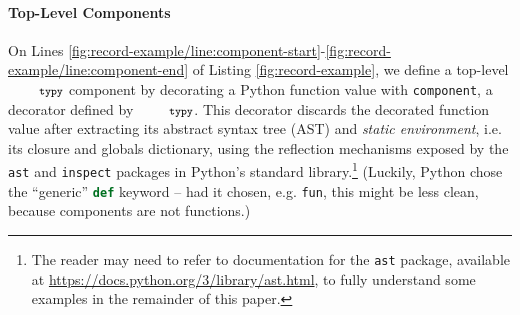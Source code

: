 \documentclass[10pt]{sigplanconf}
\newcommand{\typy}{\texttt{\footnotesize typy}}
\newcommand{\lip}[1]{\lstinline[language=Python,basicstyle=\ttfamily\footnotesize,morekeywords={with},deletendkeywords={tuple,buffer,map}]{#1}}
\newcommand{\li}[1]{\lip{#1}}
\begin{document}



\paragraph{Top-Level Components}
On Lines \ref{fig:record-example/line:component-start}-\ref{fig:record-example/line:component-end} of Listing \ref{fig:record-example}, we define a top-level $\typy$ component by decorating a Python function value with \lip{component}, a decorator defined by $\typy$. 
This decorator discards the decorated function value  after extracting its abstract syntax tree (AST) and \emph{static environment}, i.e. its closure and globals dictionary, using the reflection mechanisms exposed by the \lip{ast} and \lip{inspect}  packages in Python's standard library.\footnote{The reader may need to refer to  documentation for the \lip{ast} package, available at \url{https://docs.python.org/3/library/ast.html}, to fully understand some examples in the remainder of this paper.} (Luckily, Python chose the ``generic'' \li{def} keyword -- had it chosen, e.g. \li{fun}, this might be less clean, because components are not functions.)
\end{document}
